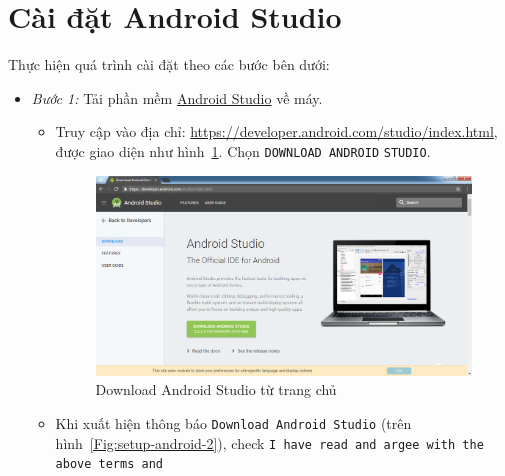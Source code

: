\documentclass[13pt,a4paper]{extreport}
\begin{document}
\section{Cài đặt Android Studio}\label{Sec:Android}
	Thực hiện quá trình cài đặt theo các bước bên dưới:
	\begin{itemize}
		\item \textit{Bước 1:} Tải phần mềm \href{https://developer.android.com/studio/index.html}{Android Studio} về máy.
			\begin{itemize}
				\item Truy cập vào địa chỉ: \url{https://developer.android.com/studio/index.html}, được giao diện như hình~\ref{Fig:setup-android-1}. Chọn \verb|DOWNLOAD ANDROID| \verb|STUDIO|.				
					\begin{figure}[!h]						
						\begin{center}
							\includegraphics[scale=0.35]{images/android-studio-setup/setup-android-1.png}
						\end{center}
						\caption{Download Android Studio từ trang chủ}
						\label{Fig:setup-android-1}
					\end{figure}

				\item Khi xuất hiện thông báo \verb|Download Android Studio| (trên hình~\ref{Fig:setup-android-2}), check \verb|I have read and argee with the above terms and|
				

\end{itemize}
\end{itemize}
\end{document}
